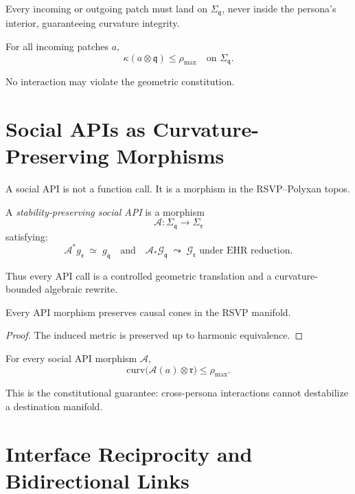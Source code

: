 Every incoming or outgoing patch must land on $\Sigma_{\mathfrak{q}}$, never 
inside the persona’s interior, guaranteeing curvature integrity.

\begin{invariant}
For all incoming patches $a$,
\[
\kappa(a \otimes \mathfrak{q}) 
\le \rho_{\max}
\quad \text{on } \Sigma_{\mathfrak{q}}.
\]
\end{invariant}

No interaction may violate the geometric constitution.


\section{Social APIs as Curvature-Preserving Morphisms}

A social API is not a function call.
It is a morphism in the RSVP--Polyxan topos.

\begin{definition}
A \emph{stability-preserving social API} is a morphism
\[
\mathcal{A} : 
\Sigma_{\mathfrak{q}} \to \Sigma_{\mathfrak{r}}
\]
satisfying:
\[
\mathcal{A}^\ast g_{\mathfrak{r}} 
\;\simeq\;
g_{\mathfrak{q}}
\quad\text{and}\quad
\mathcal{A}_\ast\mathcal{G}_{\mathfrak{q}}
\;\leadsto\;
\mathcal{G}_{\mathfrak{r}}
\text{ under EHR reduction.}
\]
\end{definition}

Thus every API call is a controlled geometric translation and a 
curvature-bounded algebraic rewrite.

\begin{lemma}
Every API morphism preserves causal cones in the RSVP manifold.
\end{lemma}

\begin{proof}
The induced metric is preserved up to harmonic equivalence.
\end{proof}

\begin{theorem}
For every social API morphism $\mathcal{A}$,
\[
\mathrm{curv}\bigl(\mathcal{A}(a)\otimes \mathfrak{r}\bigr)
\le \rho_{\max}.
\]
\end{theorem}

This is the constitutional guarantee:
cross-persona interactions cannot destabilize a destination manifold.


\section{Interface Reciprocity and Bidirectional Links}

